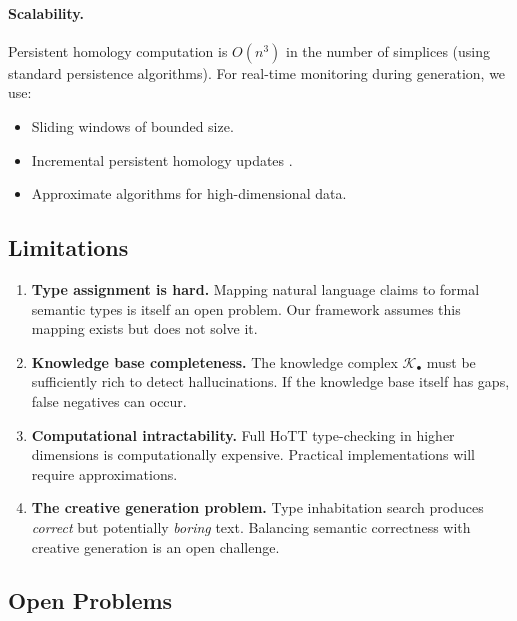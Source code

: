 \documentclass[11pt,a4paper]{article}
\theoremstyle{plain}
\theoremstyle{definition}
\theoremstyle{remark}
\begin{document}
\paragraph{Scalability.} Persistent homology computation is $O(n^3)$ in the number of simplices (using standard persistence algorithms). For real-time monitoring during generation, we use:
\begin{itemize}[nosep]
  \item Sliding windows of bounded size.
  \item Incremental persistent homology updates \cite{dey2014computing}.
  \item Approximate algorithms for high-dimensional data.
\end{itemize}

\subsection{Limitations}

\begin{enumerate}[leftmargin=*]
  \item \textbf{Type assignment is hard.} Mapping natural language claims to formal semantic types is itself an open problem. Our framework assumes this mapping exists but does not solve it.
  \item \textbf{Knowledge base completeness.} The knowledge complex $\mathcal{K}_\bullet$ must be sufficiently rich to detect hallucinations. If the knowledge base itself has gaps, false negatives can occur.
  \item \textbf{Computational intractability.} Full HoTT type-checking in higher dimensions is computationally expensive. Practical implementations will require approximations.
  \item \textbf{The creative generation problem.} Type inhabitation search produces \emph{correct} but potentially \emph{boring} text. Balancing semantic correctness with creative generation is an open challenge.
\end{enumerate}

\subsection{Open Problems}
\end{document}
